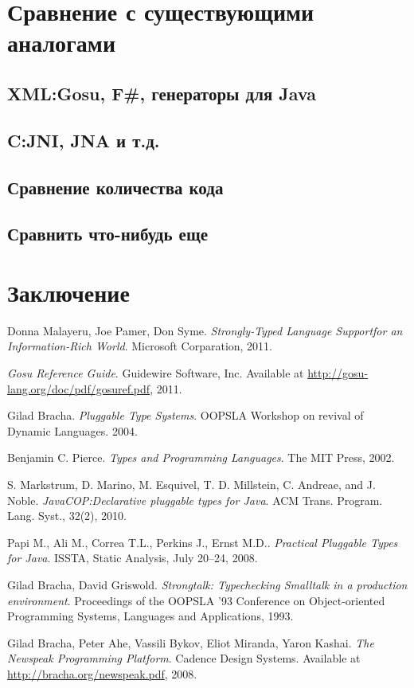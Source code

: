 \documentclass{article}
\begin{document}
\section{Сравнение с существующими аналогами}
\subsection{XML:\@ Gosu, F\#, генераторы для Java}
\subsection{C:\@ JNI, JNA и т.д.}
\subsection{Сравнение количества кода}
\subsection{Сравнить что-нибудь еще}

\section{Заключение}

\begin{thebibliography}{9}

    Donna Malayeru, Joe Pamer, Don Syme.
    \emph{Strongly-Typed Language Supportfor an Information-Rich World}.
    Microsoft Corparation,
    2011.

    \emph{Gosu Reference Guide}.
    Guidewire Software, Inc.
    Available at \url{http://gosu-lang.org/doc/pdf/gosuref.pdf},
    2011.

    Gilad Bracha.
    \emph{Pluggable Type Systems}.
    OOPSLA Workshop on revival of Dynamic Languages.
    2004.

    Benjamin C. Pierce.
    \emph{Types and Programming Languages}.
    The MIT Press, 2002.

    S. Markstrum, D. Marino, M. Esquivel, T. D. Millstein, C. Andreae, and J. Noble.
    \emph{JavaCOP:\@ Declarative pluggable types for Java}.
    ACM Trans. Program. Lang. Syst., 32(2), 2010.

    Papi M., Ali M., Correa T.L., Perkins J., Ernst M.D..
    \emph{Practical Pluggable Types for Java}.
    ISSTA, Static Analysis, July 20–24, 2008.

    Gilad Bracha, David Griswold.
    \emph{Strongtalk: Typechecking Smalltalk in a production environment}.
    Proceedings of the OOPSLA '93 Conference on Object-oriented Programming Systems, Languages and Applications, 1993.

    Gilad Bracha, Peter Ahe, Vassili Bykov, Eliot Miranda, Yaron Kashai.
    \emph{The Newspeak Programming Platform}.
    Cadence Design Systems.
    Available at \url{http://bracha.org/newspeak.pdf},
    2008.

\end{thebibliography}
\end{document}
